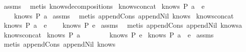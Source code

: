 \begin{isabellebody}
%
\isadelimproof
%
\endisadelimproof
%
\isatagproof
{}\isamarkupfalse%
\ assms\ \isamarkupfalse%
\ {\isacharparenleft}metis\ knows{\isacharunderscore}decomposition{\isacharunderscore}{}{\isacharunderscore}s{\isacharparenright}%
\endisatagproof
{\isafoldproof}%
%
\isadelimproof
\isanewline
%
\endisadelimproof
\isanewline
{}\isamarkupfalse%
\ knows{\isacharunderscore}concat{\isacharunderscore}{}{\isacharcolon}\isanewline
{}\ {\isachardoublequoteopen}knows\ P\ {\isacharparenleft}a\ {\isacharhash}\ e{\isacharparenright}{\isachardoublequoteclose}\isanewline
{}\ \ \ \ {\isachardoublequoteopen}knows\ P\ {\isacharbrackleft}a{\isacharbrackright}{\isachardoublequoteclose}\isanewline
%
\isadelimproof
%
\endisadelimproof
%
\isatagproof
{}\isamarkupfalse%
\ assms\ \isamarkupfalse%
\ {\isacharparenleft}metis\ append{\isacharunderscore}Cons\ append{\isacharunderscore}Nil\ knows{}{\isacharparenright}%
\endisatagproof
{\isafoldproof}%
%
\isadelimproof
\isanewline
%
\endisadelimproof
\isanewline
{}\isamarkupfalse%
\ knows{\isacharunderscore}concat{\isacharunderscore}{}{\isacharcolon}\isanewline
{}\ {\isachardoublequoteopen}knows\ P\ {\isacharparenleft}a\ {\isacharhash}\ e{\isacharparenright}{\isachardoublequoteclose}\isanewline
{}\ \ \ \ {\isachardoublequoteopen}knows\ P\ e{\isachardoublequoteclose}\isanewline
%
\isadelimproof
%
\endisadelimproof
%
\isatagproof
{}\isamarkupfalse%
\ assms\ \isamarkupfalse%
\ {\isacharparenleft}metis\ append{\isacharunderscore}Cons\ append{\isacharunderscore}Nil\ knows{}a{\isacharparenright}%
\endisatagproof
{\isafoldproof}%
%
\isadelimproof
\isanewline
%
\endisadelimproof
\isanewline
{}\isamarkupfalse%
\ knows{\isacharunderscore}concat{\isacharunderscore}{}{\isacharcolon}\isanewline
{}\ {\isachardoublequoteopen}knows\ P\ {\isacharbrackleft}a{\isacharbrackright}{\isachardoublequoteclose}\isanewline
\ \ \ \ \ \ \ \ {\isachardoublequoteopen}knows\ P\ e{\isachardoublequoteclose}\isanewline
{}\ {\isachardoublequoteopen}knows\ P\ {\isacharparenleft}a\ {\isacharhash}\ e{\isacharparenright}{\isachardoublequoteclose}\isanewline
%
\isadelimproof
%
\endisadelimproof
%
\isatagproof
{}\isamarkupfalse%
\ assms\ \isamarkupfalse%
\ {\isacharparenleft}metis\ append{\isacharunderscore}Cons\ append{\isacharunderscore}Nil\ knows{}{\isacharparenright}%

\end{isabellebody}
